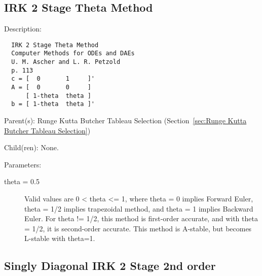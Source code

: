 \subsection{IRK 2 Stage Theta Method}
\label{sec:IRK 2 Stage Theta Method}

\begin{list}{}
  {\setlength{\leftmargin}{1.0in}
   \setlength{\labelwidth}{0.75in}
   \setlength{\labelsep}{0.125in}}
  \item[Description:]
\begin{verbatim}
  IRK 2 Stage Theta Method
  Computer Methods for ODEs and DAEs
  U. M. Ascher and L. R. Petzold
  p. 113
  c = [  0       1     ]'
  A = [  0       0     ]
      [ 1-theta  theta ]
  b = [ 1-theta  theta ]'
\end{verbatim}
  \item[Parent(s):]
    Runge Kutta Butcher Tableau Selection (Section~\ref{sec:Runge Kutta Butcher Tableau Selection})
  \item[Child(ren):]
    None. 
  \item[Parameters:]
    \begin{description}
      \item[theta = 0.5] 
Valid values are 0 < theta <= 1, where theta = 0 implies Forward Euler, theta = 1/2 implies trapezoidal method, and theta = 1 implies Backward Euler. For theta != 1/2, this method is first-order accurate, and with theta = 1/2, it is second-order accurate.  This method is A-stable, but becomes L-stable with theta=1.
\end{description}

\end{list}

\subsection{Singly Diagonal IRK 2 Stage 2nd order}
\label{sec:Singly Diagonal IRK 2 Stage 2nd order}

